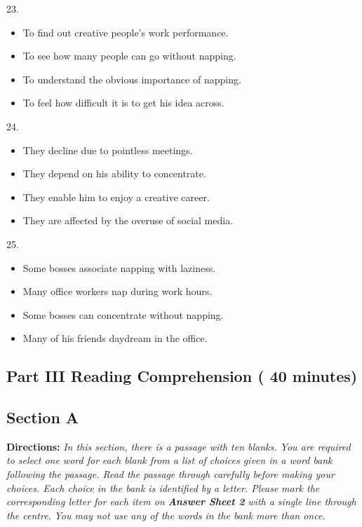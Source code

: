 \documentclass[UTF8,11pt]{ctexart}
\begin{document}
23.


\begin{itemize}[leftmargin=2em,itemsep=.2em,topsep=.4em]\item[A.] To find out creative people’s work performance.
\item[B.] To see how many people can go without napping.
\item[C.] To understand the obvious importance of napping.
\item[D.] To feel how difficult it is to get his idea across.
\end{itemize}

24.


\begin{itemize}[leftmargin=2em,itemsep=.2em,topsep=.4em]\item[A.] They decline due to pointless meetings.
\item[B.] They depend on his ability to concentrate.
\item[C.] They enable him to enjoy a creative career.
\item[D.] They are affected by the overuse of social media.
\end{itemize}

25.


\begin{itemize}[leftmargin=2em,itemsep=.2em,topsep=.4em]\item[A.] Some bosses associate napping with laziness.
\item[B.] Many office workers nap during work hours.
\item[C.] Some bosses can concentrate without napping.
\item[D.] Many of his friends daydream in the office.
\end{itemize}

\subsection*{\textbf{Part III Reading Comprehension ( 40 minutes)}}


\subsection*{\textbf{Section A}}


\textbf{Directions:} \textit{In this section, there is a passage with ten blanks. You are required to select one word for} \textit{each blank from a list of choices given in a word bank following the passage. Read the passage} \textit{through carefully before making your choices. Each choice in the bank is identified by a letter. Please} \textit{mark the corresponding letter for each item on }\textbf{\textit{Answer Sheet 2}}\textit{ with a single line through the centre.} \textit{You may not use any of the words in the bank more than once.}
\end{document}
